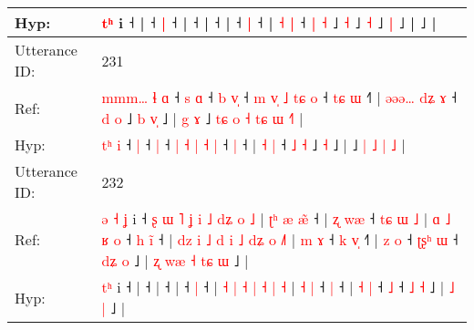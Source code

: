 \documentclass[10pt]{article}
\DeclareRobustCommand{\hl}[1]{{\textcolor{red}{#1}}}
\begin{document}
\begin{longtable}{ll}
 \\
Hyp: & \hl{}\hl{}\hl{}\hl{t}\hl{ʰ} i ˧\hl{}\hl{}\hl{}\hl{}\hl{}\hl{}\hl{}\hl{}\hl{}\hl{}\hl{}\hl{}\hl{}\hl{}\hl{}\hl{}\hl{}\hl{}\hl{} |\hl{}\hl{}\hl{}\hl{} ˧\hl{}\hl{} \hl{|} ˧ |\hl{}\hl{}\hl{}\hl{}\hl{}\hl{}\hl{}\hl{}\hl{}\hl{}\hl{} ˧ |\hl{}\hl{}\hl{}\hl{}\hl{}\hl{}\hl{}\hl{} ˧ |\hl{}\hl{}\hl{}\hl{} ˧\hl{}\hl{}\hl{} \hl{|} ˧\hl{} | \hl{˧} \hl{|} ˧ \hl{|} \hl{˧} ˩\hl{}\hl{} \hl{˧} ˩\hl{}\hl{} \hl{˧} ˩\hl{}\hl{} \hl{|} ˩ |\hl{}\hl{}\hl{}\hl{} ˩\hl{}\hl{}\hl{}\hl{}\hl{}\hl{}\hl{}\hl{}\hl{}\hl{}\hl{}\hl{}\hl{}\hl{}\hl{} |
 \\
\midrule
Utterance ID: & 231 \\
Ref: & \hl{m}\hl{m}\hl{m}\hl{…}\hl{ }\hl{ɬ} \hl{ɑ} ˧\hl{ }\hl{s} \hl{ɑ} ˧\hl{ }\hl{b} \hl{v}\hl{̩} ˧ \hl{m} \hl{v}\hl{̩} \hl{˩} \hl{t}\hl{ɕ} \hl{o} ˧\hl{ }\hl{t}\hl{ɕ} \hl{ɯ} ˧\hl{˥} |\hl{ }\hl{ə}\hl{ə}\hl{ə}\hl{…} \hl{d}\hl{ʑ} \hl{ɤ} ˧ \hl{d} \hl{o} ˩\hl{ }\hl{b} \hl{v}\hl{̩} ˩ |\hl{ }\hl{g}\hl{ }\hl{ɤ} ˩\hl{ }\hl{t}\hl{ɕ}\hl{ }\hl{o} \hl{˧} \hl{t}\hl{ɕ} \hl{ɯ} \hl{˧}\hl{˥} |
 \\
Hyp: & \hl{}\hl{}\hl{}\hl{}\hl{t}\hl{ʰ} \hl{i} ˧\hl{}\hl{} \hl{|} ˧\hl{}\hl{} \hl{}\hl{|} ˧ \hl{|} \hl{}\hl{˧} \hl{|} \hl{}\hl{˧} \hl{|} ˧\hl{}\hl{}\hl{} \hl{|} ˧\hl{} |\hl{}\hl{}\hl{}\hl{}\hl{} \hl{}\hl{˧} \hl{|} ˧ \hl{˩} \hl{˧} ˩\hl{}\hl{} \hl{}\hl{˧} ˩ |\hl{}\hl{}\hl{}\hl{} ˩\hl{}\hl{}\hl{}\hl{}\hl{} \hl{|} \hl{}\hl{˩} \hl{|} \hl{}\hl{˩} |
 \\
\midrule
Utterance ID: & 232 \\
Ref: & \hl{ə}\hl{ }\hl{˧}\hl{ }\hl{ʝ} i ˧\hl{ }\hl{ʂ}\hl{ }\hl{ɯ}\hl{ }\hl{˥}\hl{ }\hl{ʝ}\hl{ }\hl{i}\hl{ }\hl{˩}\hl{ }\hl{d}\hl{ʑ}\hl{ }\hl{o}\hl{ }\hl{˩} |\hl{ }\hl{ʈ}\hl{ʰ}\hl{ }\hl{æ}\hl{ }\hl{æ}\hl{̃} ˧ |\hl{ }\hl{ʐ}\hl{ }\hl{w}\hl{æ} ˧\hl{ }\hl{t}\hl{ɕ}\hl{ }\hl{ɯ}\hl{ }\hl{˩} |\hl{ }\hl{ɑ}\hl{ }\hl{˩}\hl{ }\hl{ʁ}\hl{ }\hl{o} ˧\hl{ }\hl{h} \hl{i}\hl{̃} ˧ |\hl{ }\hl{d}\hl{z}\hl{ }\hl{i} \hl{˩} \hl{d} \hl{i} \hl{˩} \hl{d}\hl{ʑ} \hl{o} \hl{˩}\hl{˥} | \hl{m} \hl{ɤ} ˧\hl{ }\hl{k} \hl{v}\hl{̩} ˧\hl{˥} | \hl{z} \hl{o} ˧\hl{ }\hl{ʈ}\hl{ʂ}\hl{ʰ} \hl{ɯ} ˧ \hl{d}\hl{ʑ} \hl{o} ˩ |\hl{ }\hl{ʐ}\hl{ }\hl{w}\hl{æ}\hl{ }\hl{˧} \hl{t}\hl{ɕ} \hl{ɯ} ˩ |
 \\
Hyp: & \hl{}\hl{}\hl{}\hl{t}\hl{ʰ} i ˧\hl{}\hl{}\hl{}\hl{}\hl{}\hl{}\hl{}\hl{}\hl{}\hl{}\hl{}\hl{}\hl{}\hl{}\hl{}\hl{}\hl{}\hl{}\hl{} |\hl{}\hl{}\hl{}\hl{}\hl{}\hl{}\hl{}\hl{} ˧ |\hl{}\hl{}\hl{}\hl{}\hl{} ˧\hl{}\hl{}\hl{}\hl{}\hl{}\hl{}\hl{} |\hl{}\hl{}\hl{}\hl{}\hl{}\hl{}\hl{}\hl{} ˧\hl{}\hl{} \hl{}\hl{|} ˧ |\hl{}\hl{}\hl{}\hl{}\hl{} \hl{˧} \hl{|} \hl{˧} \hl{|} \hl{}\hl{˧} \hl{|} \hl{}\hl{˧} | \hl{˧} \hl{|} ˧\hl{}\hl{} \hl{}\hl{|} ˧\hl{} | \hl{˧} \hl{|} ˧\hl{}\hl{}\hl{}\hl{} \hl{˩} ˧ \hl{}\hl{˩} \hl{˧} ˩ |\hl{}\hl{}\hl{}\hl{}\hl{}\hl{}\hl{} \hl{}\hl{˩} \hl{|} ˩ |

\end{longtable}
\end{document}
